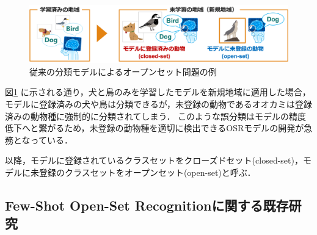 \documentclass[a4paper,11pt,nomag]{jsreport}
\begin{document}
\begin{figure}[tbp]
  \centering
  \includegraphics[width=\linewidth, keepaspectratio]{image/non_osr.png}
  \caption{従来の分類モデルによるオープンセット問題の例}
  \label{fig:non_osr}
\end{figure}

図\ref{fig:non_osr} に示される通り，犬と鳥のみを学習したモデルを新規地域に適用した場合，モデルに登録済みの犬や鳥は分類できるが，未登録の動物であるオオカミは登録済みの動物種に強制的に分類されてしまう．
このような誤分類はモデルの精度低下へと繋がるため，未登録の動物種を適切に検出できるOSRモデルの開発が急務となっている．

以降，モデルに登録されているクラスセットをクローズドセット(closed-set)，モデルに未登録のクラスセットをオープンセット(open-set)と呼ぶ．


\subsection{Few-Shot Open-Set Recognitionに関する既存研究}
\end{document}
